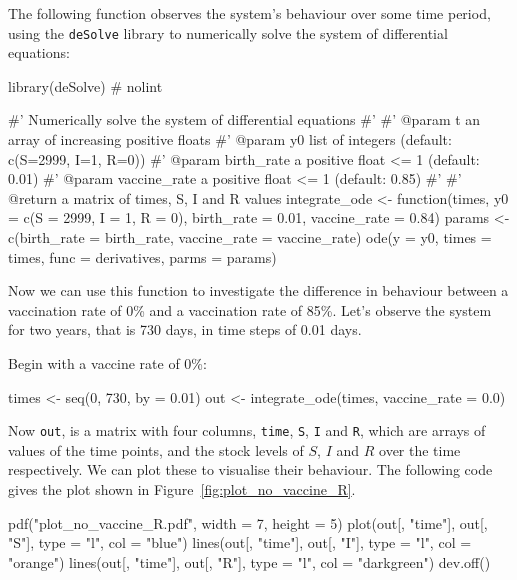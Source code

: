 The following function observes the system's behaviour over some time period,
using the \texttt{deSolve} library to numerically solve the system of
differential equations:

\begin{Rin}
library(deSolve)  # nolint

#' Numerically solve the system of differential equations
#'
#' @param t an array of increasing positive floats
#' @param y0 list of integers (default: c(S=2999, I=1, R=0))
#' @param birth_rate a positive float <= 1 (default: 0.01)
#' @param vaccine_rate a positive float <= 1 (default: 0.85)
#'
#' @return a matrix of times, S, I and R values
integrate_ode <- function(times,
                          y0 = c(S = 2999, I = 1, R = 0),
                          birth_rate = 0.01,
                          vaccine_rate = 0.84){
  params <- c(birth_rate = birth_rate,
                  vaccine_rate = vaccine_rate)
  ode(y = y0,
      times = times,
      func = derivatives,
      parms = params)
}
\end{Rin}

Now we can use this function to investigate the difference in behaviour between
a vaccination rate of 0\% and a vaccination rate of 85\%. Let's observe the
system for two years, that is 730 days, in time steps of 0.01 days.

Begin with a vaccine rate of 0\%:

\begin{Rin}
times <- seq(0, 730, by = 0.01)
out <- integrate_ode(times, vaccine_rate = 0.0)
\end{Rin}

Now \texttt{out}, is a matrix with four columns,  \texttt{time},
\texttt{S}, \texttt{I} and \texttt{R}, which are arrays of
values of the time points, and the stock levels of $S$, $I$ and $R$ over the
time respectively.
We can plot these to visualise their behaviour.
The following code gives the plot shown in Figure~\ref{fig:plot_no_vaccine_R}.


\begin{Rin-no-test}
pdf("plot_no_vaccine_R.pdf", width = 7, height = 5)
plot(out[, "time"], out[, "S"], type = "l", col = "blue")
lines(out[, "time"], out[, "I"], type = "l", col = "orange")
lines(out[, "time"], out[, "R"], type = "l", col = "darkgreen")
dev.off()
\end{Rin-no-test}


